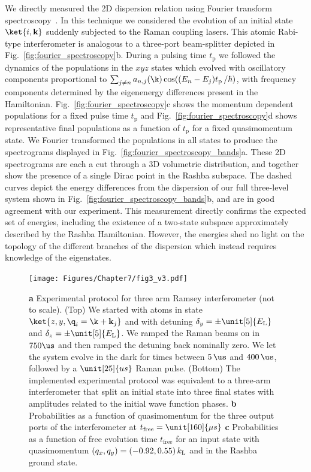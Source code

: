 We directly measured the 2D dispersion relation using Fourier transform spectroscopy~\cite{valdes-curiel_fourier_2017}. In this technique we considered the evolution of an initial state $\ket{i,\mathbf{k}}$ suddenly subjected to the Raman coupling lasers. This atomic Rabi-type interferometer is analogous to a three-port beam-splitter depicted in Fig.~\ref{fig:fourier_spectroscopy}b. During a pulsing time $t_{\mathrm{p}}$ we followed the dynamics of the populations in the $xyz$ states which evolved with oscillatory components proportional to $\sum_{j\neq n} a_{n,j}(\k)\cos((E_n-E_{j})t_{\mathrm{p}}\,/\hbar)$, with frequency components determined by the eigenenergy differences present in the Hamiltonian. Fig.~\ref{fig:fourier_spectroscopy}c shows the momentum dependent populations for a fixed pulse time $t_{\mathrm{p}}$ and Fig.~\ref{fig:fourier_spectroscopy}d shows representative final populations as a function of $t_{\mathrm{p}}$ for a fixed quasimomentum state. We Fourier transformed the populations in all states to produce the spectrograms displayed in Fig.~\ref{fig:fourier_spectroscopy_bands}a. These 2D spectrograms are each a cut through a 3D volumetric distribution, and together show the presence of a single Dirac point in the Rashba subspace. The dashed curves depict the energy differences from the dispersion of our full three-level system shown in Fig.~\ref{fig:fourier_spectroscopy_bands}b, and are in good agreement with our experiment. This measurement directly confirms the expected set of energies, including the existence of a two-state subspace approximately described by the Rashba Hamiltonian. However, the energies shed no light on the topology of the different branches of the dispersion which instead requires knowledge of the eigenstates. 
%
%
%
\begin{figure}[htb]
\begin{center}
\texttt{[image: Figures/Chapter7/fig3\_v3.pdf]}
\caption{{\bfseries a} Experimental protocol for three arm Ramsey interferometer (not to scale). (Top) We started with atoms in state $\ket{z,y,\q_i=\k+\mathbf{k}_j}$ and with detuning $\delta_y=\pm \unit[5]{E_{\rm L}}$ and $\delta_z=\pm\unit[5]{E_{\rm L}}$. We ramped the Raman beams on in $750 \us$ and then ramped the detuning back nominally zero. We let the system evolve in the dark for times between $5 \,\us$ and $400\,\us$, followed by a $\unit[25]{us}$ Raman pulse. (Bottom) The implemented experimental protocol was equivalent to a three-arm interferometer that split an initial state into three final states with amplitudes related to the initial wave function phases. {\bfseries b} Probabilities as a function of quasimomentum for the three output ports of the interferometer at $t_{\rm free}=\unit[160]{\mu s}$ {\bfseries c} Probabilities as a function of free evolution time $t_{\mathrm{free}}$ for an input state with quasimomentum $(q_x, q_y)=(-0.92, 0.55)\,k_{\rm L}$ and in the Rashba ground state.}
\label{fig:Ramsey_ramps}
\end{center}
\end{figure}

